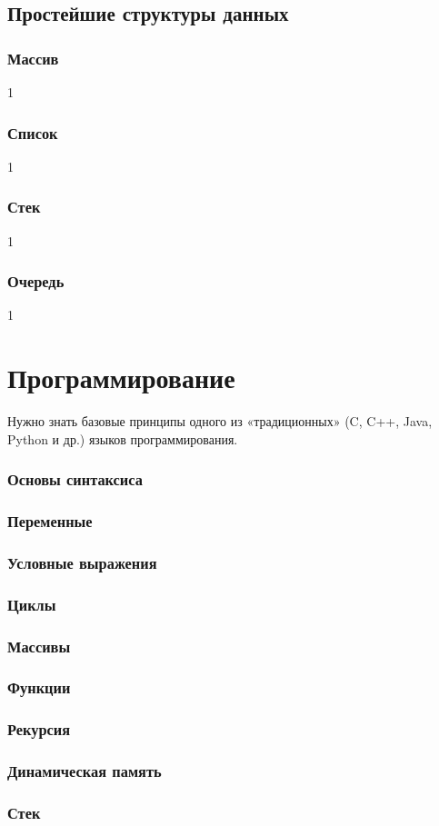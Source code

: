 \documentclass[14pt]{matmex-diploma}
\begin{document}
    \subsection{Простейшие структуры данных}
    
        \subsubsection*{Массив}
            1
        \subsubsection*{Список}
            1
        \subsubsection*{Стек}
            1
        \subsubsection*{Очередь}
            1
            
\section{Программирование}     

    Нужно знать базовые принципы одного из «традиционных» (C, C++, Java, Python и др.) языков программирования.
    
    \subsubsection*{Основы синтаксиса}
    
    \subsubsection*{Переменные}
    
    \subsubsection*{Условные выражения}
    
    \subsubsection*{Циклы}
    
    \subsubsection*{Массивы}
    
    \subsubsection*{Функции}
    
    \subsubsection*{Рекурсия}
    
    \subsubsection*{Динамическая память}
    
    \subsubsection*{Стек}
\end{document}
